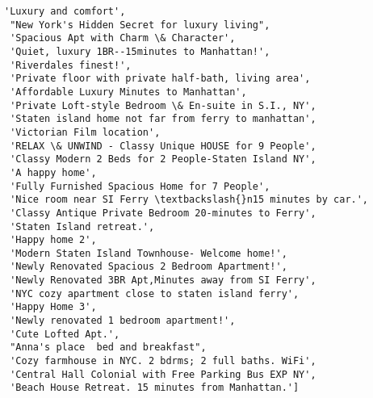 \documentclass[11pt]{article}
\begin{document}
\begin{tcolorbox}[breakable, size=fbox, boxrule=.5pt, pad at break*=1mm, opacityfill=0]
\begin{Verbatim}[commandchars=\\\{\}]
 'Luxury and comfort',
 "New York's Hidden Secret for luxury living",
 'Spacious Apt with Charm \& Character',
 'Quiet, luxury 1BR--15minutes to Manhattan!',
 'Riverdales finest!',
 'Private floor with private half-bath, living area',
 'Affordable Luxury Minutes to Manhattan',
 'Private Loft-style Bedroom \& En-suite in S.I., NY',
 'Staten island home not far from ferry to manhattan',
 'Victorian Film location',
 'RELAX \& UNWIND - Classy Unique HOUSE for 9 People',
 'Classy Modern 2 Beds for 2 People-Staten Island NY',
 'A happy home',
 'Fully Furnished Spacious Home for 7 People',
 'Nice room near SI Ferry \textbackslash{}n15 minutes by car.',
 'Classy Antique Private Bedroom 20-minutes to Ferry',
 'Staten Island retreat.',
 'Happy home 2',
 'Modern Staten Island Townhouse- Welcome home!',
 'Newly Renovated Spacious 2 Bedroom Apartment!',
 'Newly Renovated 3BR Apt,Minutes away from SI Ferry',
 'NYC cozy apartment close to staten island ferry',
 'Happy Home 3',
 'Newly renovated 1 bedroom apartment!',
 'Cute Lofted Apt.',
 "Anna's place  bed and breakfast",
 'Cozy farmhouse in NYC. 2 bdrms; 2 full baths. WiFi',
 'Central Hall Colonial with Free Parking Bus EXP NY',
 'Beach House Retreat. 15 minutes from Manhattan.']
\end{Verbatim}
\end{tcolorbox}
        
\end{document}
